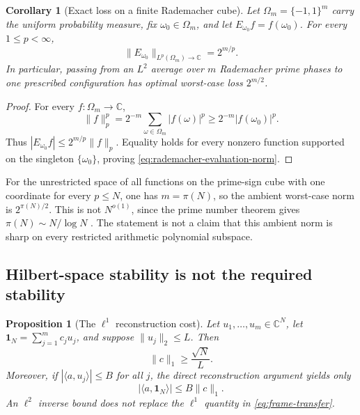 \documentclass[11pt]{amsart}
\numberwithin{equation}{section}
\theoremstyle{plain}
\newtheorem{proposition}[theorem]{Proposition}
\newtheorem{corollary}[theorem]{Corollary}
\theoremstyle{definition}
\theoremstyle{remark}
\newcommand{\one}{\mathbf 1}
\begin{document}
\begin{corollary}[Exact loss on a finite Rademacher cube]
\label{cor:rademacher-evaluation}
Let \(\Omega_m=\{-1,1\}^m\) carry the uniform probability measure, fix
\(\omega_0\in\Omega_m\), and let
\(E_{\omega_0}f=f(\omega_0)\).  For every \(1\leq p<\infty\),
\begin{equation}\label{eq:rademacher-evaluation-norm}
  \|E_{\omega_0}\|_{L^p(\Omega_m)\to\mathbb C}=2^{m/p}.
\end{equation}
In particular, passing from an \(L^2\) average over \(m\) Rademacher prime
phases to one prescribed configuration has optimal worst-case loss
\(2^{m/2}\).
\end{corollary}

\begin{proof}
For every \(f:\Omega_m\to\mathbb C\),
\begin{equation}\label{eq:rademacher-upper}
  \|f\|_p^p
  =2^{-m}\sum_{\omega\in\Omega_m}|f(\omega)|^p
  \geq 2^{-m}|f(\omega_0)|^p.
\end{equation}
Thus \(|E_{\omega_0}f|\leq2^{m/p}\|f\|_p\).  Equality holds for every
nonzero function supported on the singleton \(\{\omega_0\}\), proving
\eqref{eq:rademacher-evaluation-norm}.
\end{proof}

For the unrestricted space of all functions on the prime-sign cube with one
coordinate for every \(p\leq N\), one has \(m=\pi(N)\), so the ambient
worst-case norm is \(2^{\pi(N)/2}\).  This is not \(N^{o(1)}\), since the
prime number theorem gives \(\pi(N)\sim N/\log N\)
\cite{MontgomeryVaughan2007}.  The statement is not a
claim that this ambient norm is sharp on every restricted arithmetic
polynomial subspace.

\subsection{Hilbert-space stability is not the required stability}

\begin{proposition}[The \(\ell^1\) reconstruction cost]\label{prop:frame}
Let \(u_1,\ldots,u_m\in\mathbb C^N\), let
\(\one_N=\sum_{j=1}^{m}c_ju_j\), and suppose
\(\|u_j\|_2\leq L\).  Then
\begin{equation}\label{eq:l1-lower}
  \|c\|_1\geq\frac{\sqrt N}{L}.
\end{equation}
Moreover, if \(|\langle a,u_j\rangle|\leq B\) for all \(j\), the direct
reconstruction argument yields only
\begin{equation}\label{eq:frame-transfer}
  |\langle a,\one_N\rangle|\leq B\|c\|_1.
\end{equation}
An \(\ell^2\) inverse bound does not replace the \(\ell^1\) quantity in
\eqref{eq:frame-transfer}.
\end{proposition}
\end{document}
